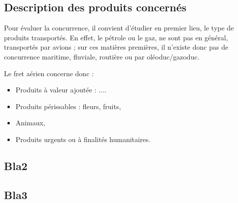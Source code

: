 \subsection{Description des produits concernés}
Pour évaluer la concurrence, il convient d'étudier en premier lieu, le type de produits transportés. En effet, le pétrole ou le gaz, ne sont pas en général, transportés par avions ; sur ces matières premières, il n'existe donc pas de concurrence maritime, fluviale, routière ou par oléoduc/gazoduc. 

Le fret aérien concerne donc :

\begin{itemize}
	\item Produits à valeur ajoutée : ....
	\item Produits périssables : fleurs, fruits, 
	\item Animaux,
	\item Produits urgents ou à finalités humanitaires.
\end{itemize}



\subsection{Bla2}





\subsection{Bla3}

